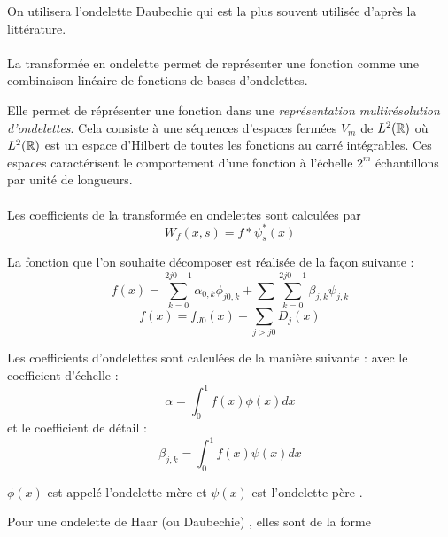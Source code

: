 On utilisera l'ondelette Daubechie qui est la plus souvent utilisée d'après la littérature.

\paragraph{}
La transformée en ondelette permet de représenter une fonction comme une combinaison linéaire de fonctions de bases d'ondelettes.

Elle permet de réprésenter une fonction dans une \emph{représentation multirésolution d'ondelettes}. Cela consiste à une séquences d'espaces fermées $V_{m}$ de $ L^{2}(\mathbb{R})$ où
$L^{2}(\mathbb{R})$ est un espace d'Hilbert de toutes les fonctions au carré intégrables.
Ces espaces caractérisent le comportement d'une fonction à l'échelle $2^{m}$ échantillons par unité de longueurs.


\paragraph{}
Les coefficients de la transformée en ondelettes sont calculées par
\begin{equation}
W_{f}(x,s) = f * \psi^{*}_{s}(x)
\end{equation}


La fonction que l'on souhaite décomposer est réalisée de la façon suivante :
\begin{equation}
f(x)= \sum^{2j0-1}_{k=0} \alpha_{0,k}\phi_{j0,k} +\sum \sum^{2j0-1}_{k=0}\beta_{j,k}\psi_{j,k}
\end{equation}
\begin{equation}
f(x) =f_{J0}(x) +\sum_{j>j0} D_{j}(x)
\end{equation}

Les coefficients d'ondelettes sont calculées de la manière suivante :
avec le coefficient d'échelle :
\begin{equation}
\alpha = \int^{1}_{0}f(x)\phi(x)dx
\end{equation}
et le coefficient de détail :
\begin{equation}
\beta_{j,k} = \int^{1}_{0}f(x)\psi(x)dx
\end{equation}

$\phi(x)$ est appelé l'ondelette mère
et $\psi(x) $ est l'ondelette père .

Pour une ondelette de Haar (ou Daubechie) , elles sont de la forme 



